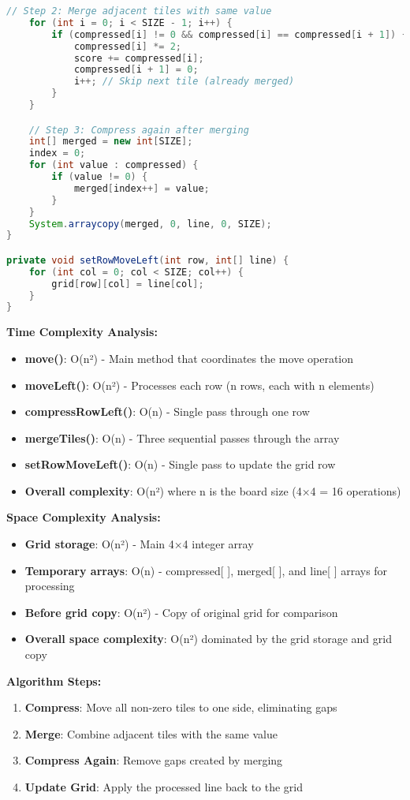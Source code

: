 \documentclass[12pt, a4paper]{article}
\begin{document}
\begin{lstlisting}[language=Java, caption=Move and Merge Algorithm]
    // Step 2: Merge adjacent tiles with same value
    for (int i = 0; i < SIZE - 1; i++) {
        if (compressed[i] != 0 && compressed[i] == compressed[i + 1]) {
            compressed[i] *= 2;
            score += compressed[i];
            compressed[i + 1] = 0;
            i++; // Skip next tile (already merged)
        }
    }

    // Step 3: Compress again after merging
    int[] merged = new int[SIZE];
    index = 0;
    for (int value : compressed) {
        if (value != 0) {
            merged[index++] = value;
        }
    }
    System.arraycopy(merged, 0, line, 0, SIZE);
}

private void setRowMoveLeft(int row, int[] line) {
    for (int col = 0; col < SIZE; col++) {
        grid[row][col] = line[col];
    }
}
\end{lstlisting}

\textbf{Time Complexity Analysis:}
\begin{itemize}
    \item \textbf{move()}: O(n²) - Main method that coordinates the move operation
    \item \textbf{moveLeft()}: O(n²) - Processes each row (n rows, each with n elements)
    \item \textbf{compressRowLeft()}: O(n) - Single pass through one row
    \item \textbf{mergeTiles()}: O(n) - Three sequential passes through the array
    \item \textbf{setRowMoveLeft()}: O(n) - Single pass to update the grid row
    \item \textbf{Overall complexity}: O(n²) where n is the board size (4×4 = 16 operations)
\end{itemize}

\textbf{Space Complexity Analysis:}
\begin{itemize}
    \item \textbf{Grid storage}: O(n²) - Main 4×4 integer array
    \item \textbf{Temporary arrays}: O(n) - compressed[ ], merged[ ], and line[ ] arrays for processing
    \item \textbf{Before grid copy}: O(n²) - Copy of original grid for comparison
    \item \textbf{Overall space complexity}: O(n²) dominated by the grid storage and grid copy
\end{itemize}

\textbf{Algorithm Steps:}
\begin{enumerate}
    \item \textbf{Compress}: Move all non-zero tiles to one side, eliminating gaps
    \item \textbf{Merge}: Combine adjacent tiles with the same value
    \item \textbf{Compress Again}: Remove gaps created by merging
    \item \textbf{Update Grid}: Apply the processed line back to the grid
\end{enumerate}
\end{document}

